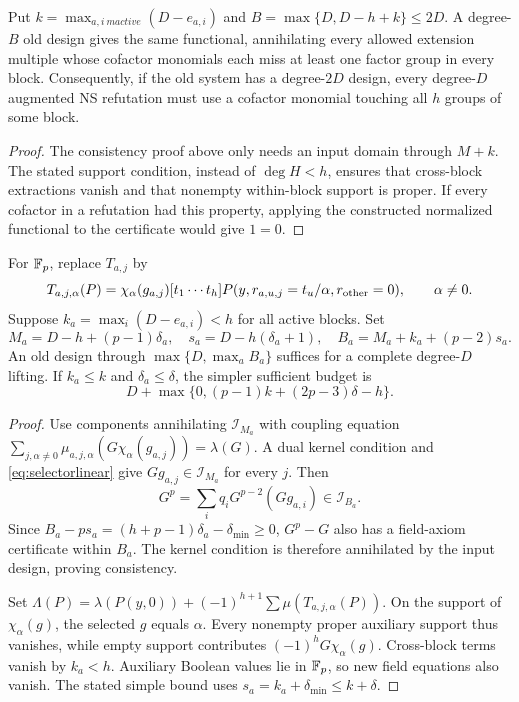 \begin{corollary}\label{cor:cofactor}
Put $k=\max_{a,i\ {
m active}}(D-e_{a,i})$ and $B=\max\{D,D-h+k\}\le2D$. A degree-$B$ old design gives the same functional, annihilating every allowed extension multiple whose cofactor monomials each miss at least one factor group in every block. Consequently, if the old system has a degree-$2D$ design, every degree-$D$ augmented NS refutation must use a cofactor monomial touching all $h$ groups of some block.
\end{corollary}
\begin{proof}
The consistency proof above only needs an input domain through $M+k$. The stated support condition, instead of $\deg H<h$, ensures that cross-block extractions vanish and that nonempty within-block support is proper. If every cofactor in a refutation had this property, applying the constructed normalized functional to the certificate would give $1=0$.
\end{proof}

\begin{lemma}\label{lem:oddwindow}
For $\mathbb F_p$, replace $T_{a,j}$ by
\[
 T_{a,j,\alpha}(P)=\chi_\alpha(g_{a,j})[t_1\cdots t_h]
 P(y,r_{a,u,j}=t_u/\alpha,r_{\rm other}=0),\qquad\alpha\ne0.
\]
Suppose $k_a=\max_i(D-e_{a,i})<h$ for all active blocks. Set
\[
 M_a=D-h+(p-1)\delta_a,\quad s_a=D-h(\delta_a+1),\quad
 B_a=M_a+k_a+(p-2)s_a.
\]
An old design through $\max\{D,\max_aB_a\}$ suffices for a complete degree-$D$ lifting. If $k_a\le k$ and $\delta_a\le\delta$, the simpler sufficient budget is
\[
 D+\max\{0,(p-1)k+(2p-3)\delta-h\}.
\]
\end{lemma}
\begin{proof}
Use components annihilating $\mathcal I_{M_a}$ with coupling equation
$\sum_{j,\alpha\ne0}\mu_{a,j,\alpha}(G\chi_\alpha(g_{a,j}))=\lambda(G)$.
A dual kernel condition and \eqref{eq:selectorlinear} give $Gg_{a,j}\in\mathcal I_{M_a}$ for every $j$. Then
\[
 G^p=\sum_iq_iG^{p-2}(Gg_{a,i})\in\mathcal I_{B_a}.
\]
Since $B_a-ps_a=(h+p-1)\delta_a-\delta_{\min}\ge0$, $G^p-G$ also has a field-axiom certificate within $B_a$. The kernel condition is therefore annihilated by the input design, proving consistency.

Set $\Lambda(P)=\lambda(P(y,0))+(-1)^{h+1}\sum\mu(T_{a,j,\alpha}(P))$. On the support of $\chi_\alpha(g)$, the selected $g$ equals $\alpha$. Every nonempty proper auxiliary support thus vanishes, while empty support contributes $(-1)^hG\chi_\alpha(g)$. Cross-block terms vanish by $k_a<h$. Auxiliary Boolean values lie in $\mathbb F_p$, so new field equations also vanish. The stated simple bound uses $s_a=k_a+\delta_{\min}\le k+\delta$.
\end{proof}

